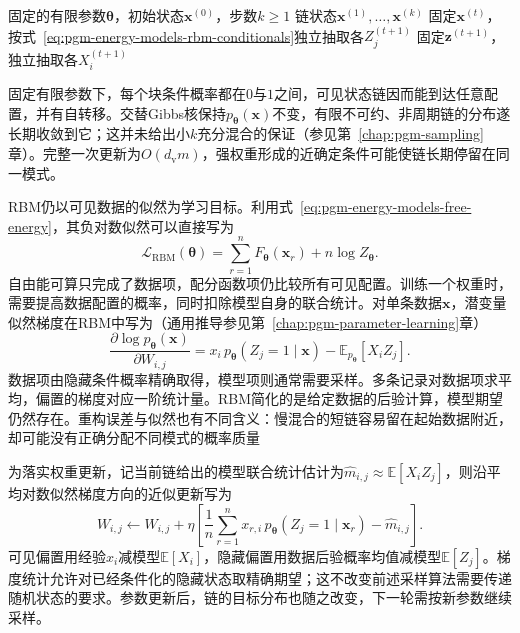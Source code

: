 \begin{algorithm}[RBM的一段交替Gibbs链]
  \label{alg:pgm-energy-models-rbm-gibbs}
  \begin{algorithmic}[1]
    \Require 固定的有限参数$\bm{\theta}$，初始状态$\bm{x}^{(0)}$，步数$k\geq1$
    \Ensure 链状态$\bm{x}^{(1)},\ldots,\bm{x}^{(k)}$
      \State 固定$\bm{x}^{(t)}$，按式~\eqref{eq:pgm-energy-models-rbm-conditionals}独立抽取各$Z_j^{(t+1)}$
      \State 固定$\bm{z}^{(t+1)}$，独立抽取各$X_i^{(t+1)}$
    \EndFor
  \end{algorithmic}
\end{algorithm}

固定有限参数下，每个块条件概率都在$0$与$1$之间，可见状态链因而能到达任意配置，并有自转移。交替Gibbs核保持$p_{\bm{\theta}}(\bm{x})$不变，有限不可约、非周期链的分布遂长期收敛到它；这并未给出小$k$充分混合的保证（参见第~\ref{chap:pgm-sampling}章）。完整一次更新为$O(d_{\mathrm{v}}m)$，强权重形成的近确定条件可能使链长期停留在同一模式。

RBM仍以可见数据的似然为学习目标。利用式~\eqref{eq:pgm-energy-models-free-energy}，其负对数似然可以直接写为
\begin{equation}
  \mathcal{L}_{\mathrm{RBM}}(\bm{\theta})
    =\sum_{r=1}^n F_{\bm{\theta}}(\bm{x}_r)
       +n\log Z_{\bm{\theta}}.
  \label{eq:pgm-energy-models-rbm-nll}
\end{equation}
自由能可算只完成了数据项，配分函数项仍比较所有可见配置。训练一个权重时，需要提高数据配置的概率，同时扣除模型自身的联合统计。对单条数据$\bm{x}$，潜变量似然梯度在RBM中写为（通用推导参见第~\ref{chap:pgm-parameter-learning}章）
\begin{equation}
  \frac{\partial\log p_{\bm{\theta}}(\bm{x})}
       {\partial W_{i,j}}
    =x_i\,p_{\bm{\theta}}(Z_j=1\mid\bm{x})
      -\mathbb{E}_{p_{\bm{\theta}}}[X_iZ_j].
  \label{eq:pgm-energy-models-rbm-gradient}
\end{equation}
数据项由隐藏条件概率精确取得，模型项则通常需要采样。多条记录对数据项求平均，偏置的梯度对应一阶统计量。RBM简化的是给定数据的后验计算，模型期望仍然存在。重构误差与似然也有不同含义：慢混合的短链容易留在起始数据附近，却可能没有正确分配不同模式的概率质量

为落实权重更新，记当前链给出的模型联合统计估计为$\widehat{m}_{i,j}\approx\mathbb{E}[X_iZ_j]$，则沿平均对数似然梯度方向的近似更新写为
\[
  W_{i,j}\leftarrow W_{i,j}+\eta\left[
      \frac1n\sum_{r=1}^n
            x_{r,i}\,p_{\bm{\theta}}(Z_j=1\mid\bm{x}_r)
       -\widehat{m}_{i,j}\right].
\]
可见偏置用经验$x_i$减模型$\mathbb{E}[X_i]$，隐藏偏置用数据后验概率均值减模型$\mathbb{E}[Z_j]$。梯度统计允许对已经条件化的隐藏状态取精确期望；这不改变前述采样算法需要传递随机状态的要求。参数更新后，链的目标分布也随之改变，下一轮需按新参数继续采样。

